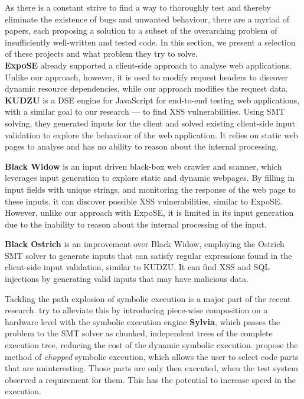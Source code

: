 As there is a constant strive to find a way to thoroughly test and thereby eliminate the existence of bugs and unwanted behaviour, there are a myriad of papers, each proposing a solution to a subset of the overarching problem of insufficiently well-written and tested code. In this section, we present a selection of these projects and what problem they try to solve.\\

\textbf{ExpoSE} already supported a client-side approach to analyse web applications. \cite{loring_practical_2021} Unlike our approach, however, it is used to modify request headers to discover dynamic resource dependencies, while our approach modifies the request data.\\

\textbf{KUDZU} \cite{saxena_symbolic_2010} is a DSE engine for JavaScript for end-to-end testing web applications, with a similar goal to our research — to find XSS vulnerabilities. Using SMT solving, they generated inputs for the client and solved existing client-side input validation to explore the behaviour of the web application. It relies on static web pages to analyse and has no ability to reason about the internal processing.

\textbf{Black Widow}\cite{eriksson_black_2021} is an input driven black-box web crawler and scanner, which leverages input generation to explore static and dynamic webpages. By filling in input fields with unique strings, and monitoring the response of the web page to these inputs, it can discover possible XSS vulnerabilities, similar to ExpoSE. However, unlike our approach with ExpoSE, it is limited in its input generation due to the inability to reason about the internal processing of the input.  

\textbf{Black Ostrich} \cite{eriksson_black_2023} is an improvement over Black Widow, employing the Ostrich SMT solver \cite{chen_ostrich_nodate} to generate inputs that can satisfy regular expressions found in the client-side input validation, similar to KUDZU. It can find XSS and SQL injections by generating valid inputs that may have malicious data. 

Tackling the path explosion of symbolic execution is a  major part of the recent research.
\citet{ryan_sylvia_2023} try to alleviate this by introducing piece-wise composition on a hardware level with the symbolic execution engine \textbf{Sylvia}, which passes the problem to the SMT solver as chunked, independent trees of the complete execution tree, reducing the cost of the dynamic symbolic execution.
\citet{trabish_chopped_2018} propose the method of \textit{chopped} symbolic execution, which allows the user to select code parts that are uninteresting. Those parts are only then executed, when the test system observed a requirement for them. This has the potential to increase speed in the execution.\\



